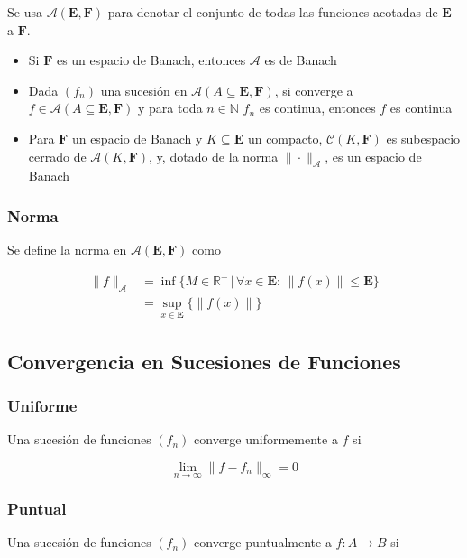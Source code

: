 Se usa $\mathcal{A}(\mathbf{E},\mathbf{F})$ para denotar el conjunto de todas las funciones acotadas de $\mathbf{E}$ a $\mathbf{F}$.

\begin{itemize}
    \item Si $\mathbf{F}$ es un espacio de Banach, entonces $\mathcal{A}$ es de Banach
    \item Dada $(f_n)$ una sucesión en $\mathcal{A}(A\subseteq\mathbf{E},\mathbf{F})$, si converge a $f\in\mathcal{A}(A\subseteq\mathbf{E},\mathbf{F})$ y para toda $n\in\mathbb{N}$ $f_n$ es continua, entonces $f$ es continua
    \item Para $\mathbf{F}$ un espacio de Banach y $K\subseteq\mathbf{E}$ un compacto, $\mathcal{C}(K,\mathbf{F})$ es subespacio cerrado de $\mathcal{A}(K,\mathbf{F})$, y, dotado de la norma $\|\cdot\|_{\mathcal{A}}$, es un espacio de Banach
\end{itemize}

\subsubsection{Norma}

Se define la norma en $\mathcal{A}(\mathbf{E},\mathbf{F})$ como

\begin{equation}
\begin{split}
\|f\|_{\mathcal{A}} &= \inf\{M\in\mathbb{R}^+\,|\,\forall x\in
\mathbf{E}:\,\|f(x)\|\leq \mathbf{E}\}\\
&= \sup_{x\in\mathbf{E}}\{\|f(x)\|\}
\end{split}
\nonumber
\end{equation}

\subsection{Convergencia en Sucesiones de Funciones}

\subsubsection{Uniforme} Una sucesión de funciones $(f_n)$ converge uniformemente a $f$ si

\[\lim_{n\to\infty}\|f-f_n\|_{\infty}=0\]

\subsubsection{Puntual} Una sucesión de funciones $(f_n)$ converge puntualmente a $f:A\to B$ si

